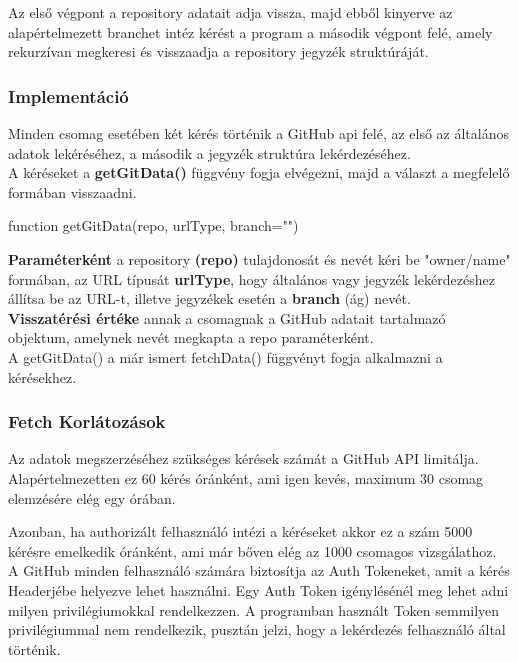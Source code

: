 Az első végpont a repository adatait adja vissza, majd ebből kinyerve az alapértelmezett branchet intéz kérést a program a második végpont felé, amely rekurzívan megkeresi és visszaadja a repository jegyzék struktúráját.

\subsubsection{Implementáció}
Minden csomag esetében két kérés történik a GitHub api felé, az első az általános adatok lekéréséhez, a második a jegyzék struktúra lekérdezéséhez.\\

A kéréseket a \textbf{getGitData()} függvény fogja elvégezni, majd a választ a megfelelő formában visszaadni.

\begin{js}
function getGitData(repo, urlType, branch="")
\end{js}
\textbf{Paraméterként} a repository \textbf{(repo)} tulajdonosát és nevét kéri be "owner/name" formában, az URL típusát \textbf{urlType}, hogy általános vagy jegyzék lekérdezéshez állítsa be az URL-t, illetve jegyzékek esetén a \textbf{branch} (ág) nevét.\\

\noindent\textbf{Visszatérési értéke} annak a csomagnak a GitHub adatait tartalmazó objektum, amelynek nevét megkapta a repo paraméterként.\\

A getGitData() a már ismert fetchData() függvényt fogja alkalmazni a kérésekhez.

\subsubsection{Fetch Korlátozások}
Az adatok megszerzéséhez szükséges kérések számát a GitHub API limitálja. Alapértelmezetten ez 60 kérés óránként, ami igen kevés, maximum 30 csomag elemzésére elég egy órában.

Azonban, ha authorizált felhasználó intézi a kéréseket akkor ez a szám 5000 kérésre emelkedik óránként, ami már bőven elég az 1000 csomagos vizsgálathoz.\\

A GitHub minden felhasználó számára biztosítja az Auth Tokeneket, amit a kérés Headerjébe helyezve lehet használni. Egy Auth Token igénylésénél meg lehet adni milyen privilégiumokkal rendelkezzen. A programban használt Token semmilyen privilégiummal nem rendelkezik, pusztán jelzi, hogy a lekérdezés felhasználó által történik.\\

